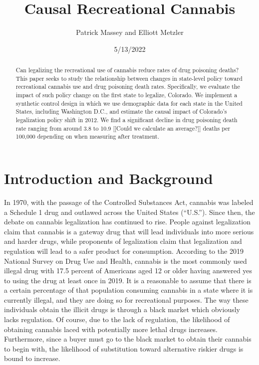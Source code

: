\documentclass{article}
\author{Patrick Massey and Elliott Metzler}
\title{Causal Recreational Cannabis}
\date{5/13/2022}
\begin{document}
\maketitle

\begin{abstract}

Can legalizing the recreational use of cannabis reduce rates of drug poisoning deaths? This paper seeks to study the relationship between changes in state-level policy toward recreational cannabis use and drug poisoning death rates. Specifically, we evaluate the impact of such policy change on the first state to legalize, Colorado. We implement a synthetic control design in which we use demographic data for each state in the United States, including Washington D.C., and estimate the causal impact of Colorado's legalization policy shift in 2012. We find a significant decline in drug poisoning death rate ranging from around 3.8 to 10.9 [[Could we calculate an average?]] deaths per 100,000 depending on when measuring after treatment.

\end{abstract}

\newpage

\section{Introduction and Background}

In 1970, with the passage of the Controlled Substances Act, cannabis was labeled a Schedule 1 drug and outlawed across the United States (``U.S.''). Since then, the debate on cannabis legalization has continued to rise. People against legalization claim that cannabis is a gateway drug that will lead individuals into more serious and harder drugs, while proponents of legalization claim that legalization and regulation will lead to a safer product for consumption. According to the 2019 National Survey on Drug Use and Health, cannabis is the most commonly used illegal drug with 17.5 percent of Americans aged 12 or older having answered yes to using the drug at least once in 2019.  It is a reasonable to assume that there is a certain percentage of that population consuming cannabis in a state where it is currently illegal, and they are doing so for recreational purposes. The way these individuals obtain the illicit drugs is through a black market which obviously lacks regulation. Of course, due to the lack of regulation, the likelihood of obtaining cannabis laced with potentially more lethal drugs increases. Furthermore, since a buyer must go to the black market to obtain their cannabis to begin with, the likelihood of substitution toward alternative riskier drugs is bound to increase.
\end{document}
